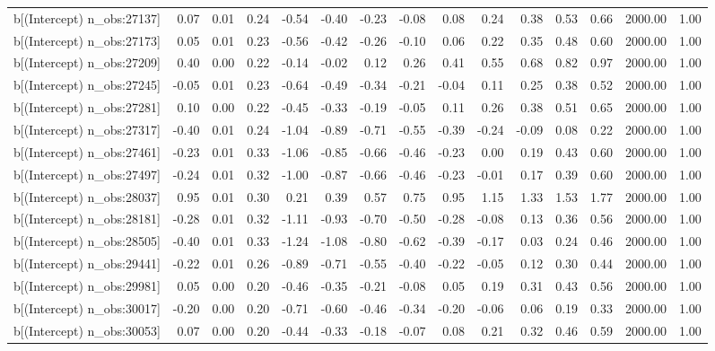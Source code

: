\begin{table}[ht]
\begin{tabular}{rrrrrrrrrrrrrrr}
  b[(Intercept) n\_obs:27137] & 0.07 & 0.01 & 0.24 & -0.54 & -0.40 & -0.23 & -0.08 & 0.08 & 0.24 & 0.38 & 0.53 & 0.66 & 2000.00 & 1.00 \\ 
  b[(Intercept) n\_obs:27173] & 0.05 & 0.01 & 0.23 & -0.56 & -0.42 & -0.26 & -0.10 & 0.06 & 0.22 & 0.35 & 0.48 & 0.60 & 2000.00 & 1.00 \\ 
  b[(Intercept) n\_obs:27209] & 0.40 & 0.00 & 0.22 & -0.14 & -0.02 & 0.12 & 0.26 & 0.41 & 0.55 & 0.68 & 0.82 & 0.97 & 2000.00 & 1.00 \\ 
  b[(Intercept) n\_obs:27245] & -0.05 & 0.01 & 0.23 & -0.64 & -0.49 & -0.34 & -0.21 & -0.04 & 0.11 & 0.25 & 0.38 & 0.52 & 2000.00 & 1.00 \\ 
  b[(Intercept) n\_obs:27281] & 0.10 & 0.00 & 0.22 & -0.45 & -0.33 & -0.19 & -0.05 & 0.11 & 0.26 & 0.38 & 0.51 & 0.65 & 2000.00 & 1.00 \\ 
  b[(Intercept) n\_obs:27317] & -0.40 & 0.01 & 0.24 & -1.04 & -0.89 & -0.71 & -0.55 & -0.39 & -0.24 & -0.09 & 0.08 & 0.22 & 2000.00 & 1.00 \\ 
  b[(Intercept) n\_obs:27461] & -0.23 & 0.01 & 0.33 & -1.06 & -0.85 & -0.66 & -0.46 & -0.23 & 0.00 & 0.19 & 0.43 & 0.60 & 2000.00 & 1.00 \\ 
  b[(Intercept) n\_obs:27497] & -0.24 & 0.01 & 0.32 & -1.00 & -0.87 & -0.66 & -0.46 & -0.23 & -0.01 & 0.17 & 0.39 & 0.60 & 2000.00 & 1.00 \\ 
  b[(Intercept) n\_obs:28037] & 0.95 & 0.01 & 0.30 & 0.21 & 0.39 & 0.57 & 0.75 & 0.95 & 1.15 & 1.33 & 1.53 & 1.77 & 2000.00 & 1.00 \\ 
  b[(Intercept) n\_obs:28181] & -0.28 & 0.01 & 0.32 & -1.11 & -0.93 & -0.70 & -0.50 & -0.28 & -0.08 & 0.13 & 0.36 & 0.56 & 2000.00 & 1.00 \\ 
  b[(Intercept) n\_obs:28505] & -0.40 & 0.01 & 0.33 & -1.24 & -1.08 & -0.80 & -0.62 & -0.39 & -0.17 & 0.03 & 0.24 & 0.46 & 2000.00 & 1.00 \\ 
  b[(Intercept) n\_obs:29441] & -0.22 & 0.01 & 0.26 & -0.89 & -0.71 & -0.55 & -0.40 & -0.22 & -0.05 & 0.12 & 0.30 & 0.44 & 2000.00 & 1.00 \\ 
  b[(Intercept) n\_obs:29981] & 0.05 & 0.00 & 0.20 & -0.46 & -0.35 & -0.21 & -0.08 & 0.05 & 0.19 & 0.31 & 0.43 & 0.56 & 2000.00 & 1.00 \\ 
  b[(Intercept) n\_obs:30017] & -0.20 & 0.00 & 0.20 & -0.71 & -0.60 & -0.46 & -0.34 & -0.20 & -0.06 & 0.06 & 0.19 & 0.33 & 2000.00 & 1.00 \\ 
  b[(Intercept) n\_obs:30053] & 0.07 & 0.00 & 0.20 & -0.44 & -0.33 & -0.18 & -0.07 & 0.08 & 0.21 & 0.32 & 0.46 & 0.59 & 2000.00 & 1.00 \\ 

\end{tabular}
\end{table}
